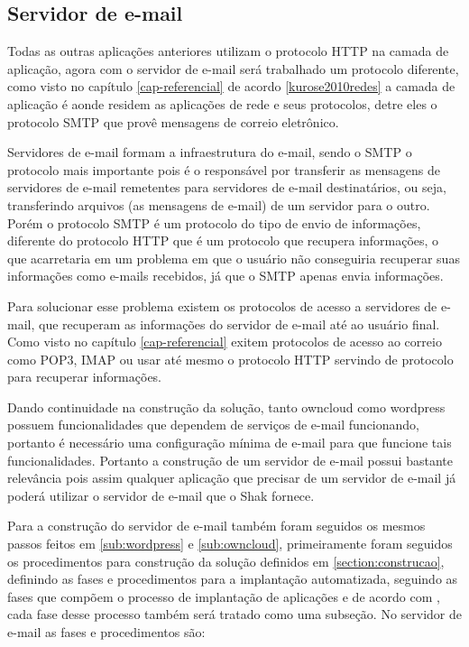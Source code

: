 \subsection{Servidor de e-mail}
\label{sub:e-mail}

Todas as outras aplicações anteriores utilizam o protocolo
HTTP na camada de aplicação, agora com o servidor de e-mail será trabalhado um
protocolo diferente, como visto no capítulo \ref{cap-referencial}
de acordo \ref{kurose2010redes} a camada de aplicação é aonde residem  as aplicações
de rede e seus protocolos, detre eles o protocolo SMTP que provê mensagens de correio
eletrônico.

Servidores de e-mail formam a infraestrutura do e-mail, sendo o SMTP o protocolo
mais importante pois é o responsável por transferir as mensagens de servidores
de e-mail remetentes para servidores de e-mail destinatários, ou seja, transferindo
arquivos (as mensagens de e-mail) de um servidor para o outro. Porém o protocolo
SMTP é um protocolo do tipo de envio de informações, diferente do protocolo HTTP
que é um protocolo que recupera informações, o que acarretaria em um problema em que
o usuário não conseguiria recuperar suas informações como e-mails recebidos, já
que o SMTP apenas envia informações.

Para solucionar esse problema existem os protocolos de acesso a servidores de
e-mail, que recuperam as informações do servidor de e-mail até ao usuário final.
Como visto no capítulo \ref{cap-referencial} exitem protocolos de acesso ao correio
como POP3, IMAP ou usar até mesmo o protocolo HTTP servindo de protocolo para recuperar
informações.

Dando continuidade na construção da solução, tanto owncloud como wordpress
possuem funcionalidades que dependem de serviços de e-mail funcionando, portanto
é necessário uma configuração mínima de e-mail para que funcione tais funcionalidades.
Portanto a construção de um servidor de e-mail possui bastante relevância pois
assim qualquer aplicação que precisar de um servidor de e-mail já poderá utilizar
o servidor de e-mail que o Shak fornece.

Para a construção do servidor de e-mail também foram seguidos os mesmos passos
feitos em \ref{sub:wordpress} e \ref{sub:owncloud}, primeiramente foram seguidos os
procedimentos para construção da solução definidos em \ref{section:construcao},
definindo as fases e procedimentos para a implantação automatizada, seguindo as
fases que compõem o processo de implantação de aplicações e de acordo com \cite{omg2006},
cada fase desse processo também será tratado como uma subseção. No servidor de e-mail
as fases e procedimentos são:

